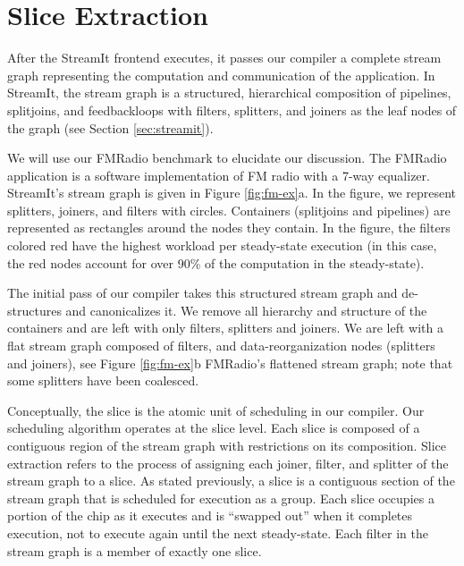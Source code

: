 \section{Slice Extraction}

\begin{figure*}
\centering
{}
\caption{FMRadio with a 7-way equalizer after the passes of the
SpaceTime Compiler.
\protect\label{fig:fm-ex}}
\end{figure*}

\label{sec:extract}
After the StreamIt frontend executes, it passes our compiler a
complete stream graph representing the computation and communication
of the application.  In StreamIt, the stream graph is a structured,
hierarchical composition of pipelines, splitjoins, and feedbackloops
with filters, splitters, and joiners as the leaf nodes of the graph
(see Section \ref{sec:streamit}).

We will use our FMRadio benchmark to elucidate our discussion.  The
FMRadio application is a software implementation of FM radio with a
7-way equalizer.  StreamIt's stream graph is given in Figure
\ref{fig:fm-ex}a.  In the figure, we represent splitters, joiners, and
filters with circles.  Containers (splitjoins and pipelines) are
represented as rectangles around the nodes they contain.  In the
figure, the filters colored red have the highest workload per
steady-state execution (in this case, the red nodes account for over
90\% of the computation in the steady-state).

The initial pass of our compiler takes this structured stream graph
and de-structures and canonicalizes it.  We remove all hierarchy and
structure of the containers and are left with only filters, splitters
and joiners. We are left with a flat stream graph composed of filters,
and data-reorganization nodes (splitters and joiners), see Figure
\ref{fig:fm-ex}b FMRadio's flattened stream graph; note that some
splitters have been coalesced.

Conceptually, the slice is the atomic unit of scheduling in our
compiler.  Our scheduling algorithm operates at the slice level.  Each
slice is composed of a contiguous region of the stream graph with
restrictions on its composition.  Slice extraction refers to the
process of assigning each joiner, filter, and splitter of the stream
graph to a slice.  As stated previously, a slice is a contiguous
section of the stream graph that is scheduled for execution as a
group. Each slice occupies a portion of the chip as it executes and is
``swapped out'' when it completes execution, not to execute again
until the next steady-state.  Each filter in the stream graph is a
member of exactly one slice.

